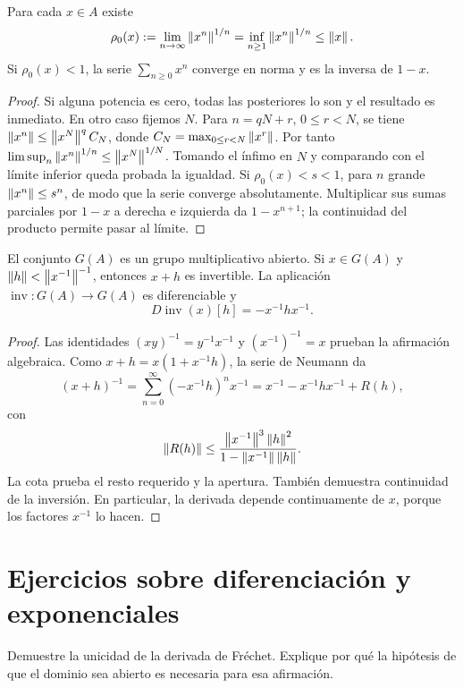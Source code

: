 \begin{lema}\label{v3:limite-raices}
Para cada $x\in A$ existe
\[
 \rho_0(x):=\lim_{n\to\infty}\left\lVert x^n\right\rVert^{1/n}
 =\inf_{n\ge1}\left\lVert x^n\right\rVert^{1/n}\le\left\lVert x\right\rVert.
\]
Si $\rho_0(x)<1$, la serie $\sum_{n\ge0}x^n$ converge en norma y es la inversa de $1-x$.
\end{lema}
\begin{proof}
Si alguna potencia es cero, todas las posteriores lo son y el resultado es inmediato. En otro caso fijemos $N$. Para $n=qN+r$, $0\le r<N$, se tiene
$\left\lVert x^n\right\rVert\le\left\lVert x^N\right\rVert^{q}C_N$, donde $C_N=\max_{0\le r<N}\left\lVert x^r\right\rVert$. Por tanto
$\limsup_n\left\lVert x^n\right\rVert^{1/n}\le\left\lVert x^N\right\rVert^{1/N}$. Tomando el ínfimo en $N$ y comparando con el límite inferior queda probada la igualdad. Si $\rho_0(x)<s<1$, para $n$ grande $\left\lVert x^n\right\rVert\le s^n$, de modo que la serie converge absolutamente. Multiplicar sus sumas parciales por $1-x$ a derecha e izquierda da $1-x^{n+1}$; la continuidad del producto permite pasar al límite.
\end{proof}

\begin{teorema}\label{v3:derivada-inversa}
El conjunto $G(A)$ es un grupo multiplicativo abierto. Si $x\in G(A)$ y $\left\lVert h\right\rVert<\left\lVert x^{-1}\right\rVert^{-1}$, entonces $x+h$ es invertible. La aplicación $\operatorname{inv}:G(A)\to G(A)$ es diferenciable y
\[
 D\operatorname{inv}(x)[h]=-x^{-1}hx^{-1}.
\]
\end{teorema}
\begin{proof}
Las identidades $(xy)^{-1}=y^{-1}x^{-1}$ y $(x^{-1})^{-1}=x$ prueban la afirmación algebraica. Como $x+h=x(1+x^{-1}h)$, la serie de Neumann da
\[
 (x+h)^{-1}=\sum_{n=0}^{\infty}(-x^{-1}h)^nx^{-1}
 =x^{-1}-x^{-1}hx^{-1}+R(h),
\]
con
\[
 \left\lVert R(h)\right\rVert\le
 \frac{\left\lVert x^{-1}\right\rVert^3\left\lVert h\right\rVert^2}{1-\left\lVert x^{-1}\right\rVert\left\lVert h\right\rVert}.
\]
La cota prueba el resto requerido y la apertura. También demuestra continuidad de la inversión. En particular, la derivada depende continuamente de $x$, porque los factores $x^{-1}$ lo hacen.
\end{proof}

\section{Ejercicios sobre diferenciación y exponenciales}

\begin{ejercicio}\label{ej:v3-l21-1}
Demuestre la unicidad de la derivada de Fréchet. Explique por qué la hipótesis de que el dominio sea abierto es necesaria para esa afirmación.
\end{ejercicio}


